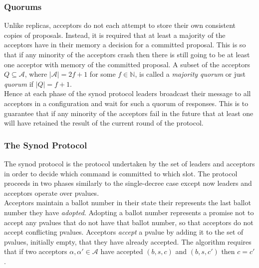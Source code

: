 \subsubsection{Quorums}




Unlike replicas, acceptors do not each attempt to store their own consistent copies of proposals. Instead, it is required that at least a majority of the acceptors have in their memory a decision for a committed proposal. This is so that if any minority of the acceptors crash then there is still going to be at least one acceptor with memory of the committed proposal. A subset of the acceptors  $Q \subseteq \mathcal{A}$, where $|\mathcal{A}| = 2f + 1$ for some $f \in \mathbb{N}$, is called a \emph{majority quorum} or just \emph{quorum} if $|Q| = f + 1$. \\

Hence at each phase of the synod protocol leaders broadcast their message to all acceptors in a configuration and wait for such a quorum of responses. This is to guarantee that if any minority of the acceptors fail in the future that at least one will have retained the result of the current round of the protocol.

\subsubsection{The Synod Protocol}

The synod protocol is the protocol undertaken by the set of leaders and acceptors in order to decide which command is committed to which slot. The protocol proceeds in two phases similarly to the single-decree case except now leaders and acceptors operate over pvalues. \\

Acceptors maintain a ballot number in their state their represents the last ballot number they have \emph{adopted}. Adopting a ballot number represents a promise not to accept any pvalues that do not have that ballot number, so that acceptors do not accept conflicting pvalues. Acceptors \emph{accept} a pvalue by adding it to the set of pvalues, initially empty, that they have already accepted. The algorithm requires that if two acceptors $\alpha, \alpha' \in \mathcal{A}$ have accepted $(b,s,c)$ and $(b,s,c')$ then $c = c'$. \\

